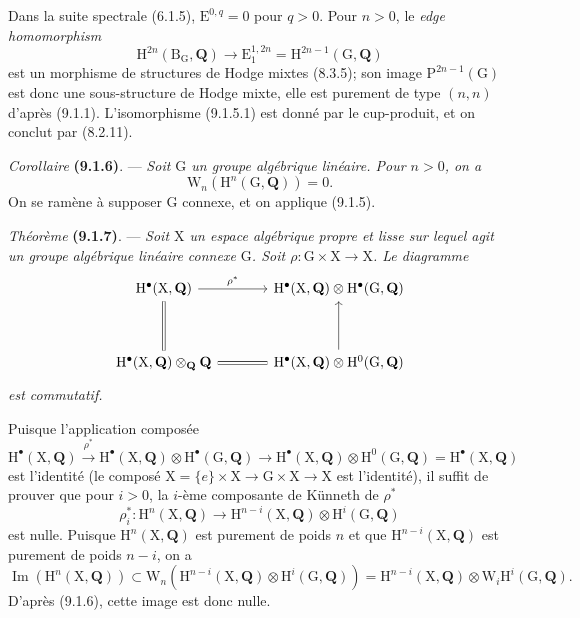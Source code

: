 \documentclass[11pt,leqno]{article}
\newcommand{\Page}[1]{\ifvmode\noindent\else\unskip\ \fi{\footnotesize\textcolor{gray}{[p.\,#1]}}\ \ignorespaces}
\begin{document}
Dans la suite spectrale (6.1.5), \(\mathrm{E}^{0,q}=0\) pour \(q>0\). Pour \(n>0\), le \textit{edge homomorphism}
\[
\mathrm{H}^{2n}(\mathrm{B}_{\mathrm{G}},\mathbf{Q})
\to\mathrm{E}_{1}^{1,2n}
=\mathrm{H}^{2n-1}(\mathrm{G},\mathbf{Q})
\]
est un morphisme de structures de Hodge mixtes (8.3.5); son image \(\mathrm{P}^{2n-1}(\mathrm{G})\) est donc une sous-structure de Hodge mixte, elle est purement de type \((n,n)\) d’après (9.1.1). L’isomorphisme (9.1.5.1) est donné par le cup-produit, et on conclut par (8.2.11).

\textit{Corollaire} \textbf{(9.1.6)}. — \textit{Soit \(\mathrm{G}\) un groupe algébrique linéaire. Pour \(n>0\), on a}
\[
\mathrm{W}_{n}(\mathrm{H}^{n}(\mathrm{G},\mathbf{Q}))=0.
\]
On se ramène à supposer \(\mathrm{G}\) connexe, et on applique (9.1.5).

\textit{Théorème} \textbf{(9.1.7)}. — \textit{Soit \(\mathrm{X}\) un espace algébrique propre et lisse sur lequel agit un groupe algébrique linéaire connexe \(\mathrm{G}\). Soit \(\rho:\mathrm{G}\times\mathrm{X}\to\mathrm{X}\). Le diagramme}
\Page{47}
\[
\begin{tikzcd}[ampersand replacement=\&, column sep=large, row sep=3.5em]
\mathrm{H}^{\bullet}(\mathrm{X},\mathbf{Q})
  \arrow[r, "\rho^{*}"] \arrow[d, equal]
\&
\mathrm{H}^{\bullet}(\mathrm{X},\mathbf{Q})\otimes
\mathrm{H}^{\bullet}(\mathrm{G},\mathbf{Q})
\\
\mathrm{H}^{\bullet}(\mathrm{X},\mathbf{Q})\otimes_{\mathbf{Q}}\mathbf{Q}
  \arrow[r, equal]
\&
\mathrm{H}^{\bullet}(\mathrm{X},\mathbf{Q})\otimes
\mathrm{H}^{0}(\mathrm{G},\mathbf{Q})
  \arrow[u]
\end{tikzcd}
\]
\textit{est commutatif.}

Puisque l’application composée
\[
\mathrm{H}^{\bullet}(\mathrm{X},\mathbf{Q})
\xrightarrow{\rho^{*}}
\mathrm{H}^{\bullet}(\mathrm{X},\mathbf{Q})\otimes\mathrm{H}^{\bullet}(\mathrm{G},\mathbf{Q})
\to
\mathrm{H}^{\bullet}(\mathrm{X},\mathbf{Q})\otimes\mathrm{H}^{0}(\mathrm{G},\mathbf{Q})
=\mathrm{H}^{\bullet}(\mathrm{X},\mathbf{Q})
\]
est l’identité (le composé \(\mathrm{X}=\{e\}\times\mathrm{X}\to\mathrm{G}\times\mathrm{X}\to\mathrm{X}\) est l’identité), il suffit de prouver que pour \(i>0\), la \(i\)-ème composante de Künneth de \(\rho^{*}\)
\[
\rho_{i}^{*}:\mathrm{H}^{n}(\mathrm{X},\mathbf{Q})
\to
\mathrm{H}^{n-i}(\mathrm{X},\mathbf{Q})\otimes\mathrm{H}^{i}(\mathrm{G},\mathbf{Q})
\]
est nulle. Puisque \(\mathrm{H}^{n}(\mathrm{X},\mathbf{Q})\) est purement de poids \(n\) et que \(\mathrm{H}^{n-i}(\mathrm{X},\mathbf{Q})\) est purement de poids \(n-i\), on a
\[
\operatorname{Im}(\mathrm{H}^{n}(\mathrm{X},\mathbf{Q}))
\subset
\mathrm{W}_{n}(\mathrm{H}^{n-i}(\mathrm{X},\mathbf{Q})\otimes\mathrm{H}^{i}(\mathrm{G},\mathbf{Q}))
=
\mathrm{H}^{n-i}(\mathrm{X},\mathbf{Q})\otimes\mathrm{W}_{i}\mathrm{H}^{i}(\mathrm{G},\mathbf{Q}).
\]
D’après (9.1.6), cette image est donc nulle.
\end{document}
